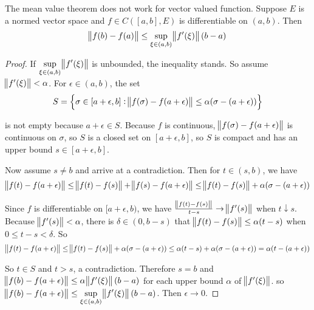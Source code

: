 \begin{theorem}
    The mean value theorem does not work for vector valued function. Suppose $E$ is a normed vector space and $f \in C([a,b], E)$ is differentiable on $(a,b)$. Then
    \begin{equation}
        \norm{f(b) - f(a)} \leq \sup_{\xi \in (a,b)} \norm{f'(\xi)}(b-a)
    \end{equation}
\end{theorem}
\begin{proof}
    If $\displaystyle \sup_{\xi \in (a,b)} \norm{f'(\xi)}$ is unbounded, the inequality stands. So assume $\norm{f'(\xi)} < \alpha$. For $\epsilon \in (a,b)$, the set
    \begin{equation*}
        S = \set{\sigma \in [a+\epsilon, b]: \norm{f(\sigma) - f(a + \epsilon)} \leq \alpha (\sigma - (a + \epsilon))}
    \end{equation*}
    
    is not empty because $a + \epsilon \in S$. Because $f$ is continuous, $\norm{f(\sigma) - f(a + \epsilon)}$ is continuous on $\sigma$, so $S$ is a closed set on $[a+\epsilon, b]$, so $S$ is compact and has an upper bound $s \in [a+\epsilon,b]$.
    
    Now assume $s \neq b$ and arrive at a contradiction. Then for $t \in (s,b)$, we have
    \begin{equation}
        \norm{f(t) - f(a+\epsilon)} \leq \norm{f(t) - f(s)} + \norm{f(s) - f(a + \epsilon)} \leq \norm{f(t) - f(s)} + \alpha (\sigma - (a + \epsilon))
    \end{equation}
    
    Since $f$ is differentiable on $[a+\epsilon, b)$, we have $\frac{\norm{f(t) -f(s)}}{t-s} \rightarrow \norm{f'(s)}$ when $t \downarrow s$. Because $\norm{f'(s)} < \alpha$, there is $\delta \in (0, b-s)$ that $\norm{f(t) - f(s)} \leq \alpha(t-s)$ when $0 \leq t-s < \delta$. So 
    \begin{equation*}
        \norm{f(t) - f(a+\epsilon)} \leq \norm{f(t) - f(s)} + \alpha (\sigma - (a + \epsilon)) \leq \alpha(t-s) + \alpha (\sigma - (a + \epsilon)) = \alpha(t - (a + \epsilon))
    \end{equation*}
    
    So $t \in S$ and $t > s$, a contradiction. Therefore $s = b$ and $\norm{f(b) - f(a+\epsilon)} \leq \alpha \norm{f'(\xi)}(b-a)$ for each upper bound $\alpha$ of $\norm{f'(\xi)}$. so $\displaystyle \norm{f(b) - f(a+\epsilon)} \leq \sup_{\xi \in (a,b)} \norm{f'(\xi)}(b-a)$. Then $\epsilon \rightarrow 0$.
\end{proof}

